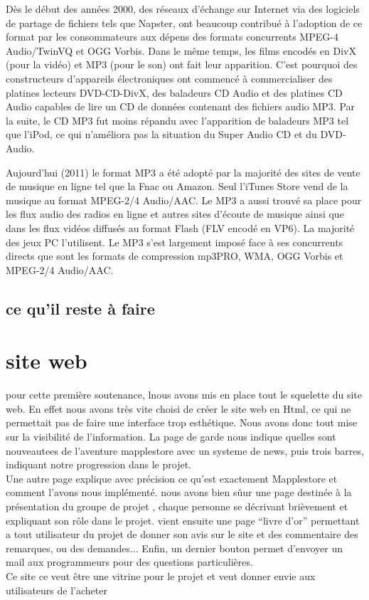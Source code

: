 \documentclass[12pt]{report}
\begin{document}
Dès le début des années 2000, des réseaux d'échange sur Internet via des logiciels de partage de fichiers tels que Napster, ont beaucoup contribué à l'adoption de ce format par les consommateurs aux dépens des formats concurrents MPEG-4 Audio/TwinVQ et OGG Vorbis. Dans le même temps, les films encodés en DivX (pour la vidéo) et MP3 (pour le son) ont fait leur apparition. C'est pourquoi des constructeurs d'appareils électroniques ont commencé à commercialiser des platines lecteurs DVD-CD-DivX, des baladeurs CD Audio et des platines CD Audio capables de lire un CD de données contenant des fichiers audio MP3. Par la suite, le CD MP3 fut moins répandu avec l'apparition de baladeurs MP3 tel que l'iPod, ce qui n'améliora pas la situation du Super Audio CD et du DVD-Audio.

Aujourd'hui (2011) le format MP3 a été adopté par la majorité des sites de vente de musique en ligne tel que la Fnac ou Amazon. Seul l'iTunes Store vend de la musique au format MPEG-2/4 Audio/AAC. Le MP3 a aussi trouvé sa place pour les flux audio des radios en ligne et autres sites d'écoute de musique ainsi que dans les flux vidéos diffusés au format Flash (FLV encodé en VP6). La majorité des jeux PC l'utilisent. Le MP3 s'est largement imposé face à ses concurrents directs que sont les formats de compression mp3PRO, WMA, OGG Vorbis et MPEG-2/4 Audio/AAC.

\section{ce qu'il reste à faire}


\chapter{site web}

pour cette première soutenance, lnous avons mis en place tout le squelette du site web. En effet nous avons très vite choisi de créer le site web en Html, ce qui ne permettait pas de faire une interface trop esthétique. Nous avons donc tout mise sur la visibilité de l'information. La page de garde nous indique quelles sont nouveautees de l'aventure mapplestore avec un systeme de news, puis trois barres, indiquant notre progression dans le projet. \\
Une autre page explique avec précision ce qu'est exactement Mapplestore et comment l'avons nous implémenté. nous avons bien sûur une page destinée à la présentation du groupe de projet , chaque personne se décrivant brièvement et expliquant son rôle dans le projet. vient ensuite une page ``livre d'or'' permettant a tout utilisateur du projet de donner son avis sur le site et des commentaire des remarques, ou des demandes... Enfin, un dernier bouton permet d'envoyer un mail aux programmeurs pour des questions particulières.\\
 Ce site ce veut être une vitrine pour le projet et veut donner envie aux utilisateurs de l'acheter
\end{document}
